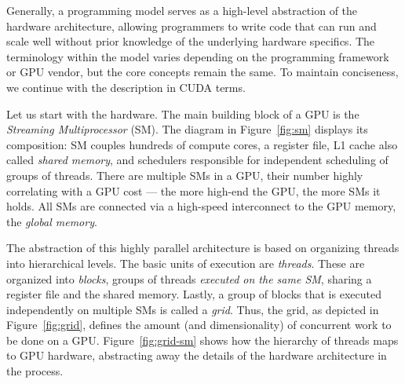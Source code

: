 Generally, a programming model serves as a high-level abstraction of the hardware architecture, allowing programmers to write code that can run and scale well without prior knowledge of the underlying hardware specifics. The terminology within the model varies depending on the programming framework or GPU vendor, but the core concepts remain the same. To maintain conciseness, we continue with the description in CUDA terms.

Let us start with the hardware. The main building block of a GPU is the \emph{Streaming Multiprocessor} (SM). The diagram in Figure~\ref{fig:sm} displays its composition: SM couples hundreds of compute cores, a register file, L1 cache also called \emph{shared memory}, and schedulers responsible for independent scheduling of groups of threads. There are multiple SMs in a GPU, their number highly correlating with a GPU cost --- the more high-end the GPU, the more SMs it holds. All SMs are connected via a high-speed interconnect to the GPU memory, the \emph{global memory}.

The abstraction of this highly parallel architecture is based on organizing threads into hierarchical levels. The basic units of execution are \emph{threads}. These are organized into \emph{blocks}, groups of threads \emph{executed on the same SM}, sharing a register file and the shared memory. Lastly, a group of blocks that is executed independently on multiple SMs is called a \emph{grid}. Thus, the grid, as depicted in Figure~\ref{fig:grid}, defines the amount (and dimensionality) of concurrent work to be done on a GPU. Figure~\ref{fig:grid-sm} shows how the hierarchy of threads maps to GPU hardware, abstracting away the details of the hardware architecture in the process.

